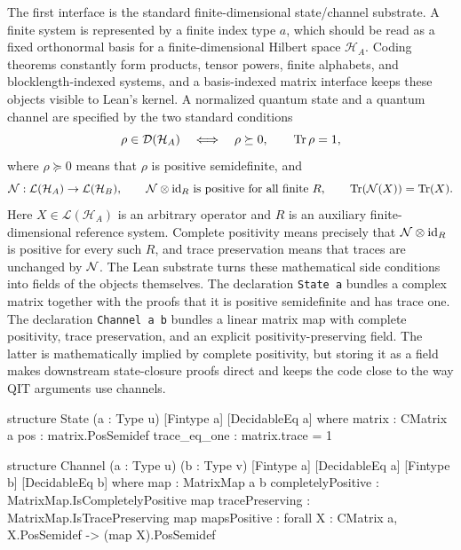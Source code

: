 \documentclass[10pt,a4paper]{article}
\newif\ifqitLineFocused
\newcommand{\qitHighlightSpan}[2]{%
	\ifnum\value{lstnumber}<#1\relax
	\else
		\ifnum\value{lstnumber}>#2\relax
		\else
			\qitLineFocusedtrue
		\fi
	\fi
}
\begin{document}
The first interface is the standard finite-dimensional state/channel substrate.  A finite system is represented by a finite index type $a$, which should be read as a fixed orthonormal basis for a finite-dimensional Hilbert space $\mathcal H_A$. Coding theorems constantly form products, tensor powers, finite alphabets, and blocklength-indexed systems, and a basis-indexed matrix interface keeps these objects visible to Lean's kernel.  A normalized quantum state and a quantum channel are specified by the two standard conditions
\begin{equation*}
    \rho \in \mathcal D(\mathcal H_A)
    \quad\Longleftrightarrow\quad
    \rho \succeq 0,\qquad \operatorname{Tr} \rho = 1,
\end{equation*}
where $\rho\succeq 0$ means that $\rho$ is positive semidefinite, and
\begin{equation*}
    {\cal N} : \mathcal L(\mathcal H_A) \to \mathcal L(\mathcal H_B),\qquad
    {\cal N} \otimes {\operatorname{id}}_R \ \text{is positive for all finite } R,\qquad
    \operatorname{Tr}({\cal N}(X))=\operatorname{Tr}(X).
\end{equation*}
Here $X\in\mathcal L(\mathcal H_A)$ is an arbitrary operator and
$R$ is an auxiliary finite-dimensional reference system.  Complete
positivity means precisely that ${\cal N}\otimes{\operatorname{id}}_R$ is positive for every
such $R$, and trace preservation means that traces are unchanged by
${\cal N}$. The Lean substrate turns these mathematical side conditions into fields of the objects themselves.  The declaration \texttt{State a} bundles a complex matrix together with the proofs that it is positive semidefinite and has trace one.  The declaration \texttt{Channel a b} bundles a linear matrix map with complete positivity, trace preservation, and an explicit positivity-preserving field.  The latter is mathematically implied by complete positivity, but
storing it as a field makes downstream state-closure proofs direct and keeps
the code close to the way QIT arguments use channels.

\begin{qitleancode}[title={Core objects: states and channels},
qit focus={\qitHighlightSpan{3}{4}\qitHighlightSpan{9}{10}}]
structure State (a : Type u) [Fintype a] [DecidableEq a] where
  matrix : CMatrix a
  pos : matrix.PosSemidef
  trace_eq_one : matrix.trace = 1

structure Channel (a : Type u) (b : Type v) [Fintype a] [DecidableEq a]
    [Fintype b] [DecidableEq b] where
  map : MatrixMap a b
  completelyPositive : MatrixMap.IsCompletelyPositive map
  tracePreserving : MatrixMap.IsTracePreserving map
  mapsPositive : forall X : CMatrix a, X.PosSemidef -> (map X).PosSemidef
\end{qitleancode}
	
\end{document}
